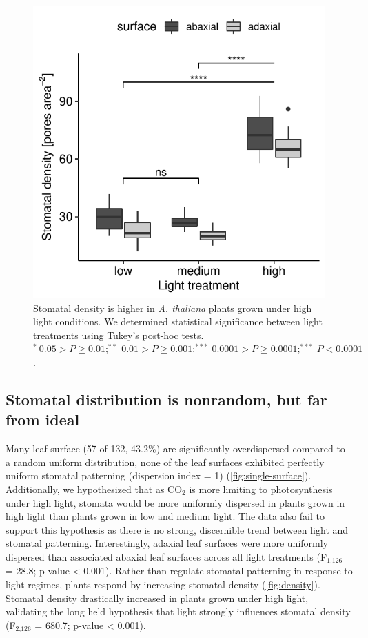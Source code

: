 \documentclass[12pt,halfline,a4paper,]{ouparticle}
\begin{document}
\begin{figure}[ht]
\includegraphics[width = \textwidth]{figures/density.pdf}
\caption{Stomatal density is higher in \textit{A. thaliana} plants grown under high light conditions. We determined statistical significance between light treatments using Tukey's post-hoc tests. $^*~0.05 > P \ge 0.01; ^{**}~0.01 > P \ge 0.001; ^{***}~0.0001 > P \ge 0.0001; ^{***}~ P <0.0001$.}
\label{fig:density}
\end{figure}

\hypertarget{stomatal-distribution-is-nonrandom-but-far-from-ideal}{%
\subsection{Stomatal distribution is nonrandom, but far from
ideal}\label{stomatal-distribution-is-nonrandom-but-far-from-ideal}}

Many leaf surface (57 of 132, 43.2\%) are significantly overdispersed
compared to a random uniform distribution, none of the leaf surfaces
exhibited perfectly uniform stomatal patterning (dispersion index = 1)
(\autoref{fig:single-surface}). Additionally, we hypothesized that as
CO\(_2\) is more limiting to photosynthesis under high light, stomata
would be more uniformly dispersed in plants grown in high light than
plants grown in low and medium light. The data also fail to support this
hypothesis as there is no strong, discernible trend between light and
stomatal patterning. Interestingly, adaxial leaf surfaces were more
uniformly dispersed than associated abaxial leaf surfaces across all
light treatments (F\(_\text{1,126}\) = 28.8; p-value \textless{} 0.001).
Rather than regulate stomatal patterning in response to light regimes,
plants respond by increasing stomatal density (\autoref{fig:density}).
Stomatal density drastically increased in plants grown under high light,
validating the long held hypothesis that light strongly influences
stomatal density (F\(_\text{2,126}\) = 680.7; p-value \textless{}
0.001).
\end{document}

